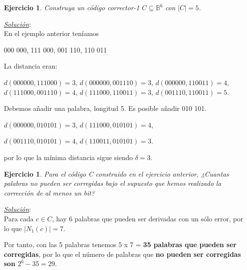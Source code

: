 \documentclass{beamer}
\theoremstyle{plain}
\theoremstyle{example}
\newtheorem{ejercicio} [Ejercicio]{Ejercicio}
\theoremstyle{example}
\begin{document}
\begin{frame}  \footnotesize \begin{ejercicio} 
Construya un código corrector-1 $C \subseteq \mathbb{B}^6$ con $|C| =5$.
\end{ejercicio}


\textit{\underline{Solución}}:\\

\vspace{0.3cm}
En el ejemplo anterior teníamos 

\begin{center}
 000 000, 111 000, 001 110, 110 011
\end{center}

 La distancia eran:

\begin{center}
$d(000 000, 111 000) = 3$,	$d(000 000, 001 110) = 3$,	$d(000 000, 110 011) = 4$,
$d(111 000, 001 110) = 4$,	$d(111 000, 110 011) = 3$,	$d(001 110, 110 011) = 5$.
\end{center}

Debemos añadir una palabra, longitud 5. Es posible añadir 010 101.

\begin{center}
$d(000 000, 010 101) = 3$,	$d(111 000, 010 101) = 4$,	

$d(001 110, 010 101) = 4$, $d(110 011, 010 101) =3$.
\end{center}

por lo que la mínima distancia sigue siendo  $\delta = 3$.

\end{frame} 

\begin{frame}  \small 

\begin{ejercicio} 

Para el código C construido en el ejercicio anterior, ¿Cuantas palabras no pueden ser corregidas bajo el supuesto que hemos realizado la corrección de al menos un bit?

\end{ejercicio} 


\textit{\underline{Solución}}:\\
\vspace{0.3cm}
Para cada $c \in C$, hay 6 palabras que pueden ser derivadas con un sólo error, por lo que $|N_1(c)|=7$.

\vspace{0.3cm}

Por tanto, con las 5 palabras tenemos 5 x 7 = \textbf{35 palabras que pueden ser corregidas}, por lo que el número de palabras que \textbf{no pueden ser corregidas son $2^6 - 35 = 29$}.

 \end{frame} 
\end{document}
